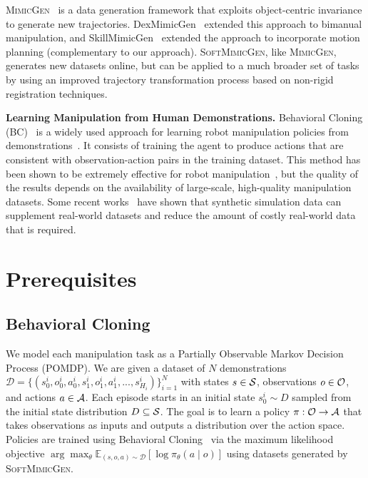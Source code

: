 \documentclass[letterpaper, 10 pt, conference]{ieeeconf}  %
\newcommand{\sysName}{\textsc{SoftMimicGen}\xspace}
\newcommand{\MimicGen}{\textsc{MimicGen}\xspace}
\begin{document}
\MimicGen~\cite{mandlekar2023mimicgen} is a data generation framework that exploits object-centric invariance to generate new trajectories. DexMimicGen~\cite{jiang2024dexmimicgen} extended this approach to bimanual manipulation, and SkillMimicGen~\cite{garrett2024skillmimicgen} extended the approach to incorporate motion planning (complementary to our approach). \sysName, like \MimicGen, generates new datasets online, but can be applied to a much broader set of tasks by using an improved trajectory transformation process based on non-rigid registration techniques.


\textbf{Learning Manipulation from Human Demonstrations.}
Behavioral Cloning (BC)~\cite{pomerleau1989alvinn} is a widely used approach for learning robot manipulation policies from demonstrations~\cite{schaal1999imitation, Ijspeert2002MovementIW, mandlekar2021matters, chi2023diffusion}. It consists of training the agent to produce actions that are consistent with observation-action pairs in the training dataset. This method has been shown to be extremely effective for robot manipulation~\cite{Billard2008RobotPB, Calinon2010LearningAR, zeng2020transporter, black2024pi_0, khazatsky2024droid, brohan2023rt}, but the quality of the results depends on the availability of large-scale, high-quality manipulation datasets. Some recent works~\cite{maddukuri2025sim, wei2025empirical, bjorck2025gr00t} have shown that synthetic simulation data can supplement real-world datasets and reduce the amount of costly real-world data that is required.


\section{Prerequisites}


\subsection{Behavioral Cloning}
\label{subsec:bc}


We model each manipulation task as a Partially Observable Markov Decision Process (POMDP). We are given a dataset of $N$ demonstrations $\mathcal{D} = \{(s_0^i, o_0^i, a_0^i, s_1^i, o_1^i, a_1^i, ..., s_{H_i}^i)\}_{i=1}^N$ with states $s \in {\cal S}$, observations $o \in {\cal O}$, and actions $a \in {\cal A}$. Each episode starts in an initial state $s_0^i \sim D$ sampled from the initial state distribution $D \subseteq {\cal S}$. The goal is to learn a policy $\pi: {\cal O} \to {\cal A}$ that takes observations as inputs and outputs a distribution over the action space. Policies are trained using Behavioral Cloning~\cite{pomerleau1989alvinn} via the maximum likelihood objective $\arg\max_{\theta} \mathbb{E}_{(s, o, a) \sim \mathcal{D}} [\log \pi_{\theta}(a \mid o)]$ using datasets generated by \sysName.
\end{document}

